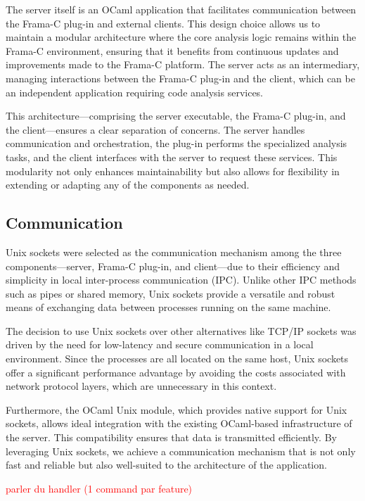 \documentclass[10pt]{article}
\begin{document}
\begin{singlespace}
The server itself is an OCaml application that facilitates communication between the Frama-C plug-in and external clients. This design choice allows us to maintain a modular architecture where the core analysis logic remains within the Frama-C environment, ensuring that it benefits from continuous updates and improvements made to the Frama-C platform. The server acts as an intermediary, managing interactions between the Frama-C plug-in and the client, which can be an independent application requiring code analysis services. 

This architecture---comprising the server executable, the Frama-C plug-in, and the client---ensures a clear separation of concerns. The server handles communication and orchestration, the plug-in performs the specialized analysis tasks, and the client interfaces with the server to request these services. This modularity not only enhances maintainability but also allows for flexibility in extending or adapting any of the components as needed.

\subsection{Communication}
Unix sockets were selected as the communication mechanism among the three components---server, Frama-C plug-in, and client---due to their efficiency and simplicity in local inter-process communication (IPC). Unlike other IPC methods such as pipes or shared memory, Unix sockets provide a versatile and robust means of exchanging data between processes running on the same machine.

The decision to use Unix sockets over other alternatives like TCP/IP sockets was driven by the need for low-latency and secure communication in a local environment. Since the processes are all located on the same host, Unix sockets offer a significant performance advantage by avoiding the costs associated with network protocol layers, which are unnecessary in this context.

Furthermore, the OCaml Unix module, which provides native support for Unix sockets, allows ideal integration with the existing OCaml-based infrastructure of the server. This compatibility ensures that data is transmitted efficiently. By leveraging Unix sockets, we achieve a communication mechanism that is not only fast and reliable but also well-suited to the architecture of the application.

\textcolor{red}{parler du handler (1 command par feature)}


\end{singlespace}
\end{document}
